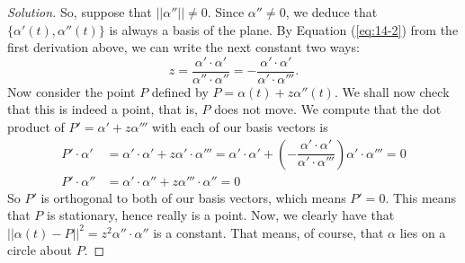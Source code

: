 \documentclass[Shifrin_Solutions_Spring_2018]{subfiles}
\begin{document}
\begin{proof}[Solution]
So, suppose that $||\alpha''||\neq 0$. Since $\alpha'' \neq 0$, we deduce that 
$\{ \alpha'(t), \alpha''(t) \}$ is always a basis of the plane.
By Equation (\ref{eq:14-2}) from the first derivation above, we can write the next constant 
two ways:
\[
z = \dfrac{\alpha'\cdot \alpha'}{\alpha''\cdot\alpha''} = - \dfrac{\alpha'\cdot \alpha'}
{\alpha' \cdot \alpha'''} .
\]
Now consider the point $P$ defined by $ P = \alpha(t) + z \alpha''(t)$. We shall now check 
that this is indeed a point, that is, $P$ does not move.
We compute that the dot product of $P'= \alpha' + z \alpha'''$ with each of our basis vectors is
\begin{align*}
P' \cdot \alpha'& = \alpha' \cdot \alpha' + z \alpha' \cdot \alpha''' = \alpha' \cdot \alpha' 
+ \left( - \dfrac{\alpha'\cdot \alpha'}{\alpha' \cdot \alpha'''} \right) 
\alpha' \cdot \alpha''' = 0 \\
P' \cdot \alpha'' &  = \alpha' \cdot \alpha'' + z \alpha'''\cdot \alpha'' = 0
\end{align*}
So $P'$ is orthogonal to both of our basis vectors, which means $P'=0$.
This means that $P$ is stationary, hence really is a point. Now, we clearly have that 
$||\alpha(t) - P ||^2 = z^2 \alpha'' \cdot \alpha'' $ is a constant. That means, of course, 
that $\alpha$ lies on a circle about $P$.
\end{proof}


\vfill
\end{document}

